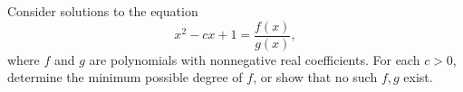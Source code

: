 Consider solutions to the equation \[x^2-cx+1=\frac{f\left(x\right)}{g\left(x\right)},\] where $f$ and $g$ are polynomials with nonnegative real coefficients. For each $c>0$, determine the minimum possible degree of $f$, or show that no such $f,g$ exist.